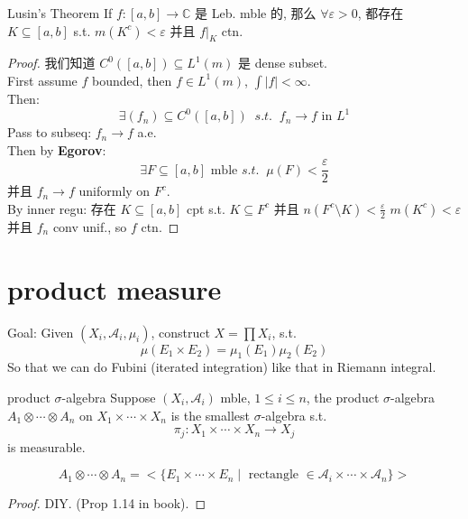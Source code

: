 \documentclass[lang=cn,11pt]{elegantbook}
\begin{document}
\begin{theorem}{Lusin's Theorem}
\label{Lusin's Theorem}
    If $f: [a,b] \rightarrow \mathbb{C}$ 是 Leb. mble 的, 那么 $\forall \varepsilon > 0$, 都存在 $K \subseteq [a,b]$ s.t. $m(K^c) < \varepsilon$ 并且 $f|_K$ ctn.
\end{theorem}
\begin{proof}
我们知道 $C^0([a,b]) \subseteq L^1(m)$ 是 dense subset.\\
First assume $f$ bounded, then $f\in L^1(m)$, $\int|f| < \infty$.\\
Then: \[\exists (f_n)  \subseteq C^0([a,b])  \;\;s.t. \;\; f_n\rightarrow f \text{ in } L^1 \]
Pass to subseq: $f_n\rightarrow f$ a.e.\\
Then by \textbf{Egorov}: \[
\exists F \subseteq [a,b] \text{ mble } s.t. \;\; \mu(F) < \frac{\varepsilon}{2}
\]
并且 $f_n \rightarrow f$ uniformly on $F^c$.\\
By inner regu: 存在 $K \subseteq [a,b] $ cpt s.t. $K \subseteq F^c$ 并且 $n(F^c \setminus K ) < \frac{\varepsilon}{2}$
$m(K^c) < \varepsilon$ 并且 $f_n$ conv unif., so $f$ ctn.

\end{proof}






\chapter{product measure}




Goal: Given $(X_i, \mathcal{A}_i, \mu_i)$, construct $X = \prod X_i $, s.t. 
\[
\mu(E_1 \times E_2 )  = \mu_1(E_1) \mu_2(E_2)
\]
So that we can do Fubini (iterated integration) like that in Riemann integral.



\begin{definition}{product $\sigma$-algebra}
Suppose $(X_i, \mathcal{A}_i)$ mble, $1 \leq i\leq n$, the product $\sigma$-algebra $A_1 \otimes \cdots \otimes A_n$ on $X_1 \times \cdots \times X_n$ is the smallest $\sigma$-algebra s.t.$$ \pi_j: X_1 \times \cdots \times X_n \rightarrow X_j$$is measurable.
\end{definition}




\begin{proposition}
$$A_1 \otimes \cdots \otimes A_n = <\{  E_1\times \cdots \times E_n \mid \text{ rectangle }\in \mathcal{A}_i \times \cdots \times \mathcal{A}_n  \}>$$
\end{proposition}
\begin{proof}
    DIY. (Prop 1.14 in book).
\end{proof}
\end{document}
